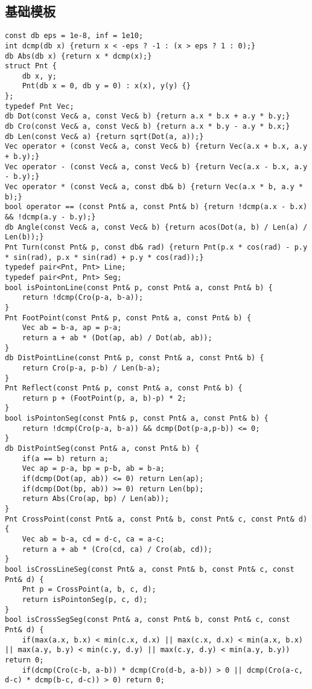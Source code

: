 \documentclass{article}
\begin{document}
   \subsection{基础模板}
   \begin{lstlisting}
const db eps = 1e-8, inf = 1e10;
int dcmp(db x) {return x < -eps ? -1 : (x > eps ? 1 : 0);}
db Abs(db x) {return x * dcmp(x);}
struct Pnt {
	db x, y;
	Pnt(db x = 0, db y = 0) : x(x), y(y) {}
};
typedef Pnt Vec;
db Dot(const Vec& a, const Vec& b) {return a.x * b.x + a.y * b.y;}
db Cro(const Vec& a, const Vec& b) {return a.x * b.y - a.y * b.x;}
db Len(const Vec& a) {return sqrt(Dot(a, a));}
Vec operator + (const Vec& a, const Vec& b) {return Vec(a.x + b.x, a.y + b.y);}
Vec operator - (const Vec& a, const Vec& b) {return Vec(a.x - b.x, a.y - b.y);}
Vec operator * (const Vec& a, const db& b) {return Vec(a.x * b, a.y * b);}
bool operator == (const Pnt& a, const Pnt& b) {return !dcmp(a.x - b.x) && !dcmp(a.y - b.y);}
db Angle(const Vec& a, const Vec& b) {return acos(Dot(a, b) / Len(a) / Len(b));}
Pnt Turn(const Pnt& p, const db& rad) {return Pnt(p.x * cos(rad) - p.y * sin(rad), p.x * sin(rad) + p.y * cos(rad));}
typedef pair<Pnt, Pnt> Line;
typedef pair<Pnt, Pnt> Seg;
bool isPointonLine(const Pnt& p, const Pnt& a, const Pnt& b) {
    return !dcmp(Cro(p-a, b-a));
}
Pnt FootPoint(const Pnt& p, const Pnt& a, const Pnt& b) {
    Vec ab = b-a, ap = p-a;
    return a + ab * (Dot(ap, ab) / Dot(ab, ab));
}
db DistPointLine(const Pnt& p, const Pnt& a, const Pnt& b) {
    return Cro(p-a, p-b) / Len(b-a);
}
Pnt Reflect(const Pnt& p, const Pnt& a, const Pnt& b) {
    return p + (FootPoint(p, a, b)-p) * 2;
}
bool isPointonSeg(const Pnt& p, const Pnt& a, const Pnt& b) {
    return !dcmp(Cro(p-a, b-a)) && dcmp(Dot(p-a,p-b)) <= 0;
}
db DistPointSeg(const Pnt& a, const Pnt& b) {
    if(a == b) return a;
    Vec ap = p-a, bp = p-b, ab = b-a;
    if(dcmp(Dot(ap, ab)) <= 0) return Len(ap);
    if(dcmp(Dot(bp, ab)) >= 0) return Len(bp);
    return Abs(Cro(ap, bp) / Len(ab));
}
Pnt CrossPoint(const Pnt& a, const Pnt& b, const Pnt& c, const Pnt& d) {
    Vec ab = b-a, cd = d-c, ca = a-c;
    return a + ab * (Cro(cd, ca) / Cro(ab, cd));
}
bool isCrossLineSeg(const Pnt& a, const Pnt& b, const Pnt& c, const Pnt& d) {
    Pnt p = CrossPoint(a, b, c, d);
    return isPointonSeg(p, c, d);
}
bool isCrossSegSeg(const Pnt& a, const Pnt& b, const Pnt& c, const Pnt& d) {
    if(max(a.x, b.x) < min(c.x, d.x) || max(c.x, d.x) < min(a.x, b.x) || max(a.y, b.y) < min(c.y, d.y) || max(c.y, d.y) < min(a.y, b.y)) return 0;
    if(dcmp(Cro(c-b, a-b)) * dcmp(Cro(d-b, a-b)) > 0 || dcmp(Cro(a-c, d-c) * dcmp(b-c, d-c)) > 0) return 0;

\end{lstlisting}
\end{document}
